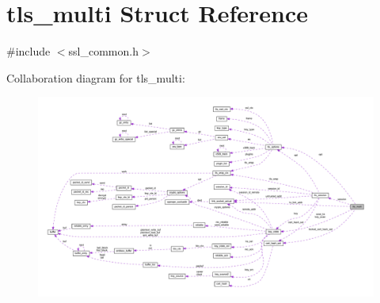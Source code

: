 \hypertarget{structtls__multi}{}\section{tls\+\_\+multi Struct Reference}
\label{structtls__multi}


{\ttfamily \#include $<$ssl\+\_\+common.\+h$>$}



Collaboration diagram for tls\+\_\+multi\+:
\nopagebreak
\begin{figure}[H]
\begin{center}
\leavevmode
\includegraphics[width=350pt]{structtls__multi__coll__graph}
\end{center}
\end{figure}
